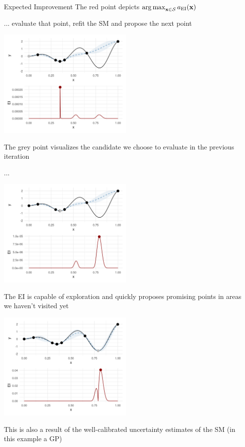 \documentclass[11pt,compress,t,notes=noshow, xcolor=table]{beamer}
\begin{document}
\begin{vbframe}{Expected Improvement}
The red point depicts $\operatorname{arg\,max}_{\mathbf{x} \in \mathcal{S}} a_{\text{EI}}(\mathbf{x})$

\framebreak

... evaluate that point, refit the SM and propose the next point

\begin{center}
  \includegraphics[width = 0.5\textwidth]{figure_man/bayesian_loop_2.png}
\end{center}

The grey point visualizes the candidate we choose to evaluate in the previous iteration

\framebreak

...

\begin{center}
  \includegraphics[width = 0.5\textwidth]{figure_man/bayesian_loop_3.png}
\end{center}

\framebreak

The EI is capable of exploration and quickly proposes promising points in areas we haven't visited yet

\begin{center}
  \includegraphics[width = 0.5\textwidth]{figure_man/bayesian_loop_4.png}
\end{center}

This is also a result of the well-calibrated uncertainty estimates of the SM (in this example a GP)

\end{vbframe}
\end{document}
